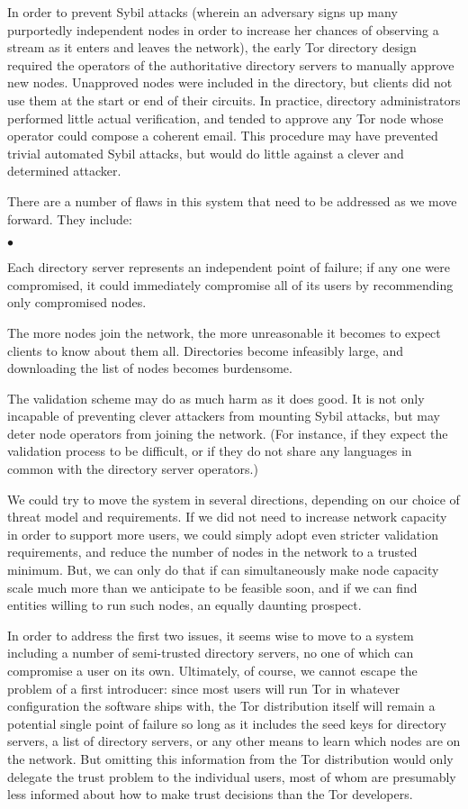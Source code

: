\documentclass{llncs}
\newenvironment{tightlist}{\begin{list}{$\bullet$}{
  \setlength{\itemsep}{0mm}
    \setlength{\parsep}{0mm}
    }}{\end{list}}
\begin{document}
In order to prevent Sybil attacks (wherein an adversary signs up many
purportedly independent nodes in order to increase her chances of observing
a stream as it enters and leaves the network), the early Tor directory design
required the operators of the authoritative directory servers to manually
approve new nodes.  Unapproved nodes were included in the directory,
but clients
did not use them at the start or end of their circuits.  In practice,
directory administrators performed little actual verification, and tended to
approve any Tor node whose operator could compose a coherent email.
This procedure
may have prevented trivial automated Sybil attacks, but would do little
against a clever and determined attacker.

There are a number of flaws in this system that need to be addressed as we
move forward.  They include:
\begin{tightlist}
\item Each directory server represents an independent point of failure; if
  any one were compromised, it could immediately compromise all of its users
  by recommending only compromised nodes.
\item The more nodes join the network, the more unreasonable it
  becomes to expect clients to know about them all.  Directories
  become infeasibly large, and downloading the list of nodes becomes
  burdensome.
\item The validation scheme may do as much harm as it does good.  It is not
  only incapable of preventing clever attackers from mounting Sybil attacks,
  but may deter node operators from joining the network.  (For instance, if
  they expect the validation process to be difficult, or if they do not share
  any languages in common with the directory server operators.)
\end{tightlist}

We could try to move the system in several directions, depending on our
choice of threat model and requirements.  If we did not need to increase
network capacity in order to support more users, we could simply
 adopt even stricter validation requirements, and reduce the number of
nodes in the network to a trusted minimum.  
But, we can only do that if can simultaneously make node capacity
scale much more than we anticipate to be feasible soon, and if we can find
entities willing to run such nodes, an equally daunting prospect.


In order to address the first two issues, it seems wise to move to a system
including a number of semi-trusted directory servers, no one of which can
compromise a user on its own.  Ultimately, of course, we cannot escape the
problem of a first introducer: since most users will run Tor in whatever
configuration the software ships with, the Tor distribution itself will
remain a potential single point of failure so long as it includes the seed
keys for directory servers, a list of directory servers, or any other means
to learn which nodes are on the network.  But omitting this information
from the Tor distribution would only delegate the trust problem to the
individual users, most of whom are presumably less informed about how to make
trust decisions than the Tor developers.
\end{document}
